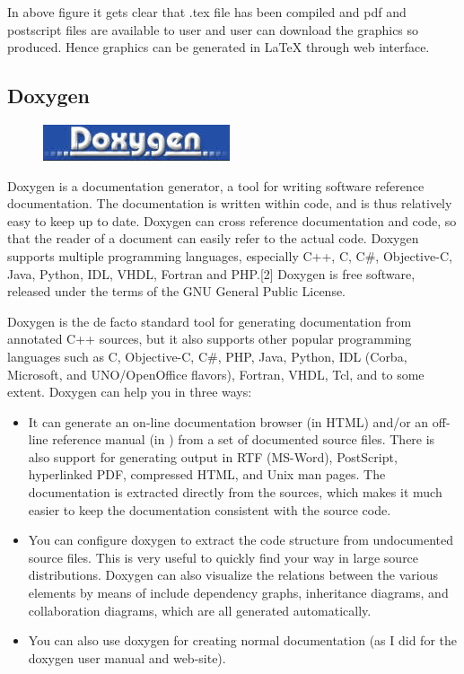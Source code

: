 \noindent In above figure it gets clear that .tex file has been compiled and pdf and postscript files
are available to user and user can download the graphics so produced. Hence graphics
can be generated in \LaTeX{} through web interface.

\subsection{Doxygen}
\begin{figure}[h]
	\centering \includegraphics[scale=1]{images/doxygen.jpg}
\end{figure}
Doxygen is a documentation generator, a tool for writing software reference documentation. The documentation is written within code, and is thus relatively easy to keep up to date. Doxygen can cross reference documentation and code, so that the reader of a document can easily refer to the actual code.
Doxygen supports multiple programming languages, especially C++, C, C\#, Objective-C, Java, Python, IDL, VHDL, Fortran and PHP.[2] Doxygen is free software, released under the terms of the GNU General Public License.

Doxygen is the de facto standard tool for generating documentation from annotated C++ sources, but it also supports other popular programming languages such as C, Objective-C, C\#, PHP, Java, Python, IDL (Corba, Microsoft, and UNO/OpenOffice flavors), Fortran, VHDL, Tcl, and to some extent.
Doxygen can help you in three ways:

\begin{itemize}
	\item It can generate an on-line documentation browser (in HTML) and/or an off-line reference manual (in ) from a set of documented source files. There is also support for generating output in RTF (MS-Word), PostScript, hyperlinked PDF, compressed HTML, and Unix man pages. The documentation is extracted directly from the sources, which makes it much easier to keep the documentation consistent with the source code.
	\item You can configure doxygen to extract the code structure from undocumented source files. This is very useful to quickly find your way in large source distributions. Doxygen can also visualize the relations between the various elements by means of include dependency graphs, inheritance diagrams, and collaboration diagrams, which are all generated automatically.
	\item You can also use doxygen for creating normal documentation (as I did for the doxygen user manual and web-site).
\end{itemize}

